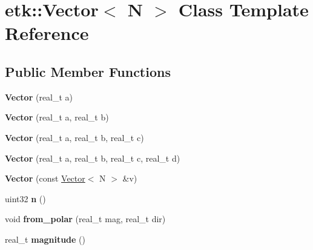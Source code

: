 \hypertarget{classetk_1_1_vector}{\section{etk\-:\-:Vector$<$ N $>$ Class Template Reference}
\label{classetk_1_1_vector}
}
\subsection*{Public Member Functions}
\begin{DoxyCompactItemize}
\item 
\hypertarget{classetk_1_1_vector_a6b7a5ed810f0d3dbafd40d84b8026064}{{\bfseries Vector} (real\-\_\-t a)}\label{classetk_1_1_vector_a6b7a5ed810f0d3dbafd40d84b8026064}

\item 
\hypertarget{classetk_1_1_vector_a3afdaaee9d9bd8eac6ae080057f92bea}{{\bfseries Vector} (real\-\_\-t a, real\-\_\-t b)}\label{classetk_1_1_vector_a3afdaaee9d9bd8eac6ae080057f92bea}

\item 
\hypertarget{classetk_1_1_vector_ae8b64c865822eb6d8cbc592ae18fcb0d}{{\bfseries Vector} (real\-\_\-t a, real\-\_\-t b, real\-\_\-t c)}\label{classetk_1_1_vector_ae8b64c865822eb6d8cbc592ae18fcb0d}

\item 
\hypertarget{classetk_1_1_vector_ab78f640e7097301342793dee4cde47ce}{{\bfseries Vector} (real\-\_\-t a, real\-\_\-t b, real\-\_\-t c, real\-\_\-t d)}\label{classetk_1_1_vector_ab78f640e7097301342793dee4cde47ce}

\item 
\hypertarget{classetk_1_1_vector_a481e7f68fc0703cc25a337e2ba20fd62}{{\bfseries Vector} (const \hyperlink{classetk_1_1_vector}{Vector}$<$ N $>$ \&v)}\label{classetk_1_1_vector_a481e7f68fc0703cc25a337e2ba20fd62}

\item 
\hypertarget{classetk_1_1_vector_a91d0d6ca60f0f394eb73aea335169584}{uint32 {\bfseries n} ()}\label{classetk_1_1_vector_a91d0d6ca60f0f394eb73aea335169584}

\item 
\hypertarget{classetk_1_1_vector_a9b23ec41375868f1d38697c6f335672f}{void {\bfseries from\-\_\-polar} (real\-\_\-t mag, real\-\_\-t dir)}\label{classetk_1_1_vector_a9b23ec41375868f1d38697c6f335672f}

\item 
\hypertarget{classetk_1_1_vector_a3e0b749c5a48e99e1d2a2d8c02c03c2e}{real\-\_\-t {\bfseries magnitude} ()}\label{classetk_1_1_vector_a3e0b749c5a48e99e1d2a2d8c02c03c2e}


\end{DoxyCompactItemize}
